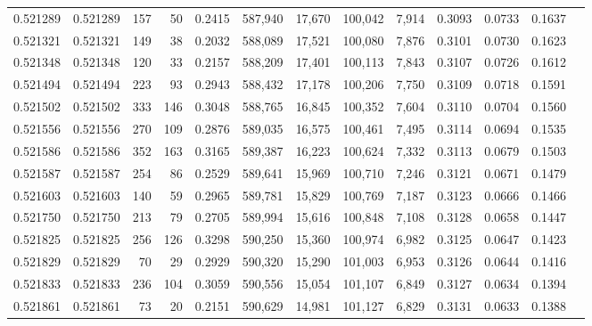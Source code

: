 \begin{tabular}{rrrrrrrrrrrrr}
0.521289 & 0.521289 &   157 &    50 &                                     0.2415 & 587,940 &  17,670 & 100,042 &   7,914 & 0.3093 & 0.0733 & 0.1637 \\
0.521321 & 0.521321 &   149 &    38 &                                     0.2032 & 588,089 &  17,521 & 100,080 &   7,876 & 0.3101 & 0.0730 & 0.1623 \\
0.521348 & 0.521348 &   120 &    33 &                                     0.2157 & 588,209 &  17,401 & 100,113 &   7,843 & 0.3107 & 0.0726 & 0.1612 \\
0.521494 & 0.521494 &   223 &    93 &                                     0.2943 & 588,432 &  17,178 & 100,206 &   7,750 & 0.3109 & 0.0718 & 0.1591 \\
0.521502 & 0.521502 &   333 &   146 &                                     0.3048 & 588,765 &  16,845 & 100,352 &   7,604 & 0.3110 & 0.0704 & 0.1560 \\
0.521556 & 0.521556 &   270 &   109 &                                     0.2876 & 589,035 &  16,575 & 100,461 &   7,495 & 0.3114 & 0.0694 & 0.1535 \\
0.521586 & 0.521586 &   352 &   163 &                                     0.3165 & 589,387 &  16,223 & 100,624 &   7,332 & 0.3113 & 0.0679 & 0.1503 \\
0.521587 & 0.521587 &   254 &    86 &                                     0.2529 & 589,641 &  15,969 & 100,710 &   7,246 & 0.3121 & 0.0671 & 0.1479 \\
0.521603 & 0.521603 &   140 &    59 &                                     0.2965 & 589,781 &  15,829 & 100,769 &   7,187 & 0.3123 & 0.0666 & 0.1466 \\
0.521750 & 0.521750 &   213 &    79 &                                     0.2705 & 589,994 &  15,616 & 100,848 &   7,108 & 0.3128 & 0.0658 & 0.1447 \\
0.521825 & 0.521825 &   256 &   126 &                                     0.3298 & 590,250 &  15,360 & 100,974 &   6,982 & 0.3125 & 0.0647 & 0.1423 \\
0.521829 & 0.521829 &    70 &    29 &                                     0.2929 & 590,320 &  15,290 & 101,003 &   6,953 & 0.3126 & 0.0644 & 0.1416 \\
0.521833 & 0.521833 &   236 &   104 &                                     0.3059 & 590,556 &  15,054 & 101,107 &   6,849 & 0.3127 & 0.0634 & 0.1394 \\
0.521861 & 0.521861 &    73 &    20 &                                     0.2151 & 590,629 &  14,981 & 101,127 &   6,829 & 0.3131 & 0.0633 & 0.1388 \\

\end{tabular}
